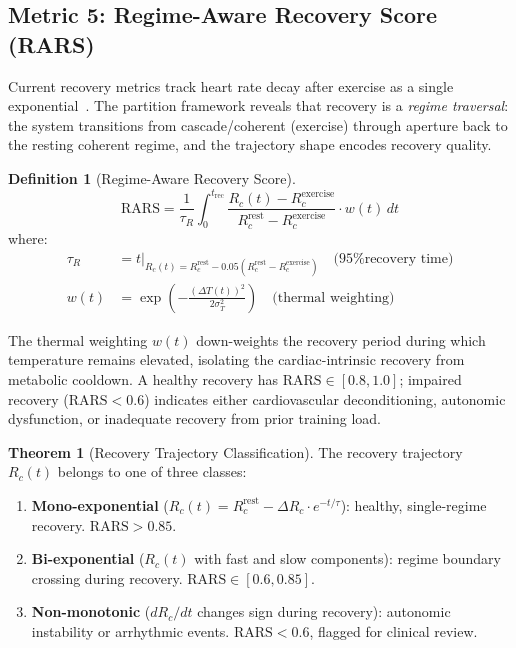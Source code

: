 \documentclass[10pt,twocolumn,a4paper]{article}
\theoremstyle{definition}
\newtheorem{theorem}{Theorem}
\newtheorem{definition}{Definition}
\newcommand{\Rc}{R_c}
\newcommand{\RARS}{\text{RARS}}
\begin{document}
\subsection{Metric 5: Regime-Aware Recovery Score (RARS)}

Current recovery metrics track heart rate decay after exercise as a
single exponential~\cite{cole1999heart}. The partition framework reveals
that recovery is a \emph{regime traversal}: the system transitions from
cascade/coherent (exercise) through aperture back to the resting
coherent regime, and the trajectory shape encodes recovery quality.

\begin{definition}[Regime-Aware Recovery Score]
\label{def:rars}
\begin{equation}
\label{eq:rars}
\boxed{
\RARS = \frac{1}{\tau_R} \int_0^{t_{\text{rec}}}
\frac{\Rc(t) - \Rc^{\text{exercise}}}
{\Rc^{\text{rest}} - \Rc^{\text{exercise}}}
\cdot w(t)\, dt
}
\end{equation}
where:
\begin{align}
\tau_R &= t\big|_{\Rc(t) = \Rc^{\text{rest}} - 0.05(\Rc^{\text{rest}} - \Rc^{\text{exercise}})}
\quad \text{(95\% recovery time)}\\
w(t) &= \exp\!\left(-\frac{(\Delta T(t))^2}{2\sigma_T^2}\right)
\quad \text{(thermal weighting)}
\end{align}
\end{definition}

The thermal weighting $w(t)$ down-weights the recovery period during
which temperature remains elevated, isolating the cardiac-intrinsic
recovery from metabolic cooldown. A healthy recovery has
$\RARS \in [0.8, 1.0]$; impaired recovery ($\RARS < 0.6$) indicates
either cardiovascular deconditioning, autonomic dysfunction, or
inadequate recovery from prior training load.

\begin{theorem}[Recovery Trajectory Classification]
\label{thm:recovery}
The recovery trajectory $\Rc(t)$ belongs to one of three classes:
\begin{enumerate}[nosep]
\item \textbf{Mono-exponential} ($\Rc(t) = \Rc^{\text{rest}}
  - \Delta\Rc \cdot e^{-t/\tau}$): healthy, single-regime recovery.
  $\RARS > 0.85$.
\item \textbf{Bi-exponential} ($\Rc(t)$ with fast and slow components):
  regime boundary crossing during recovery. $\RARS \in [0.6, 0.85]$.
\item \textbf{Non-monotonic} ($d\Rc/dt$ changes sign during recovery):
  autonomic instability or arrhythmic events.
  $\RARS < 0.6$, flagged for clinical review.
\end{enumerate}
\end{theorem}
\end{document}
